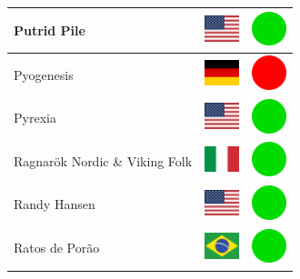\documentclass[12pt, a4paper, twoside]{report}
\begin{document}
\begin{center}
\begin{longtable}{|p{5cm}|p{2cm}|p{2cm}|}
 Putrid Pile                                                & \includegraphics[width=1cm]{../img/flags/us} &   \includegraphics[width=1cm]{../likes/y} \\ \hline
 Pyogenesis                                                 & \includegraphics[width=1cm]{../img/flags/de} &   \includegraphics[width=1cm]{../likes/n} \\ \hline
 Pyrexia                                                    & \includegraphics[width=1cm]{../img/flags/us} &   \includegraphics[width=1cm]{../likes/y} \\ \hline
 Ragnarök Nordic \& Viking Folk                             & \includegraphics[width=1cm]{../img/flags/it} &   \includegraphics[width=1cm]{../likes/y} \\ \hline
 Randy Hansen                                               & \includegraphics[width=1cm]{../img/flags/us} &   \includegraphics[width=1cm]{../likes/y} \\ \hline
 Ratos de Porão                                             & \includegraphics[width=1cm]{../img/flags/br} &   \includegraphics[width=1cm]{../likes/y} \\ \hline

\end{longtable}
\end{center}
\end{document}
